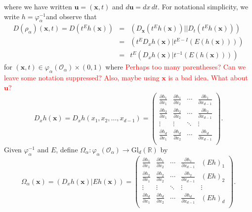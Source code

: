 \documentclass[11pt]{article}
\theoremstyle{theorem}
\newcommand\GldR{\mbox{Gl}_d(\mathbb{R})}
\begin{document}
where we have written $\mathbf{u}=(\mathbf{x},t)$ and $d\mathbf{u}=dx\,dt$. For notational simplicity, we write $h=\varphi_{\alpha}^{-1}$and observe that
\begin{eqnarray*}
D(\rho_\alpha)(\mathbf{x},t)=D(t^Eh(\mathbf{x}))&=&\left(D_{\mathbf{x}}\left(t^Eh(\mathbf{x})\right)\big\vert|D_t\left(t^Eh(\mathbf{x})\right)\right)\\
&=&\left(t^E D_x h(\mathbf{x})\big\vert t^{E-I}(E(h(\mathbf{x})))\right)\\
&=&t^E\left(D_x h(\mathbf{x})\big\vert t^{-1}(E(h(\mathbf{x})))\right)
\end{eqnarray*}
for $(\mathbf{x},t)\in \varphi_\alpha(\mathcal{O}_\alpha)\times (0,1)$ where \textcolor{red}{Perhaps too many parentheses? Can we leave some notation suppressed? Also, maybe using $\mathbf{x}$ is a bad idea. What about $\mathbf{u}$?}
\begin{equation*}
D_x h(\mathbf{x})=D_x h(x_1,x_2,\dots,x_{d-1})=
\begin{pmatrix}
\frac{\partial h_1}{\partial x_1} & \frac{\partial h_1}{\partial x_2} & \cdots & \frac{\partial h_1}{\partial x_{d-1}}\\
\frac{\partial h_2}{\partial x_1} & \frac{\partial h_2}{\partial x_2} & \cdots & \frac{\partial h_2}{\partial x_{d-1}}\\
 \vdots & \vdots &\ddots & \vdots\\
\frac{\partial h_d}{\partial x_1} & \frac{\partial h_d}{\partial x_2} & \cdots & \frac{\partial h_d}{\partial x_{d-1}}\\
\end{pmatrix}.
\end{equation*}
Given $\varphi_\alpha^{-1}$ and $E$, define $\Omega_\alpha:\varphi_{\alpha}(\mathcal{O}_\alpha)\to \GldR$ by
\begin{equation*}
\Omega_\alpha(\mathbf{x})=\left(D_x h(\mathbf{x})\big\vert Eh(\mathbf{x})\right)=
\begin{pmatrix}
\frac{\partial h_1}{\partial x_1} & \frac{\partial h_1}{\partial x_2} & \cdots & \frac{\partial h_1}{\partial x_{d-1}} & (Eh)_1\\
\frac{\partial h_2}{\partial x_1} & \frac{\partial h_2}{\partial x_2} & \cdots & \frac{\partial h_2}{\partial x_{d-1}} & (Eh)_2\\
 \vdots & \vdots &\ddots & \vdots & \vdots \\
\frac{\partial h_d}{\partial x_1} & \frac{\partial h_d}{\partial x_2} & \cdots & \frac{\partial h_d}{\partial x_{d-1}} & (Eh)_d\\
\end{pmatrix}.
\end{equation*}
\end{document}
